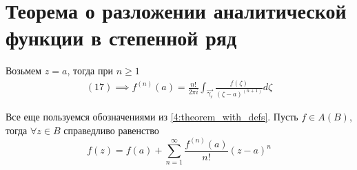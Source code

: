 \documentclass[main]{subfiles}
\begin{document}
\section{Теорема о разложении аналитической функции в степенной ряд}

Возьмем $z = a$, тогда при $n \ge 1$
\begin{gather*}
    (17) \implies f^{(n)} (a) = \frac{n!}{2 \pi i} \int_{\overrightarrow{\gamma_r}} \frac{f(\zeta)}{(\zeta - a)^{(n+1)}} d\zeta \tag{18}
\end{gather*}
\begin{theorem}
    Все еще пользуемся обозначениями из \ref{4:theorem_with_defs}.
    Пусть $f \in A(B)$, тогда $\forall z \in B$ справедливо равенство
    \[f(z) = f(a) + \sum_{n=1}^{\infty} \frac{f^{(n)}  (a)}{n!}(z-a)^n \tag{19}\]
\end{theorem}
\end{document}
